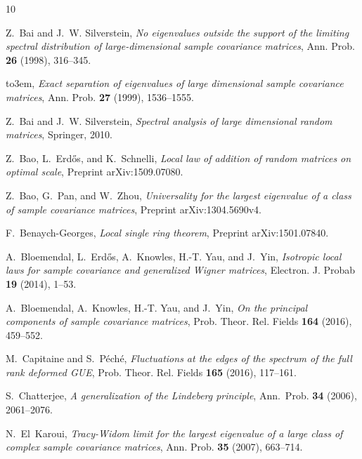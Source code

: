 \documentclass[11pt]{article} %
\numberwithin{equation}{section}
\numberwithin{figure}{section}
\theoremstyle{plain} %
\theoremstyle{definition} %
\begin{document}
{\small

\providecommand{\bysame}{\leavevmode\hbox to3em{\hrulefill}\thinspace}
\providecommand{\MR}{\relax\ifhmode\unskip\space\fi MR }
\providecommand{\MRhref}[2]{%
  \href{http://www.ams.org/mathscinet-getitem?mr=#1}{#2}
}
\providecommand{\href}[2]{#2}
\begin{thebibliography}{10}

Z.~Bai and J.~W. Silverstein, \emph{No eigenvalues outside the support of the
  limiting spectral distribution of large-dimensional sample covariance
  matrices}, Ann. Prob. \textbf{26} (1998), 316--345.

\bysame, \emph{Exact separation of eigenvalues of large dimensional sample
  covariance matrices}, Ann. Prob. \textbf{27} (1999), 1536--1555.

Z.~Bai and J.~W. Silverstein, \emph{Spectral analysis of large dimensional
  random matrices}, Springer, 2010.

Z.~Bao, L.~Erd\H{o}s, and K.~Schnelli, \emph{Local law of addition of random
  matrices on optimal scale}, Preprint arXiv:1509.07080.

Z.~Bao, G.~Pan, and W.~Zhou, \emph{Universality for the largest eigenvalue of a
  class of sample covariance matrices}, Preprint arXiv:1304.5690v4.

F.~Benaych-Georges, \emph{Local single ring theorem}, Preprint
  arXiv:1501.07840.

A.~Bloemendal, L.~Erd{\H{o}}s, A.~Knowles, H.-T. Yau, and J.~Yin,
  \emph{Isotropic local laws for sample covariance and generalized {W}igner
  matrices}, Electron. J. Probab \textbf{19} (2014), 1--53.

A.~Bloemendal, A.~Knowles, H.-T. Yau, and J.~Yin, \emph{On the principal
  components of sample covariance matrices}, Prob. Theor. Rel. Fields
  \textbf{164} (2016), 459--552.

M.~Capitaine and S.~P\'ech\'e, \emph{Fluctuations at the edges of the spectrum
  of the full rank deformed {GUE}}, Prob. Theor. Rel. Fields \textbf{165}
  (2016), 117--161.

S.~Chatterjee, \emph{A generalization of the {L}indeberg principle}, Ann.\
  Prob. \textbf{34} (2006), 2061--2076.

N.~El~Karoui, \emph{{T}racy-{W}idom limit for the largest eigenvalue of a large
  class of complex sample covariance matrices}, Ann. Prob. \textbf{35} (2007),
  663--714.


\end{thebibliography}}
\end{document}
